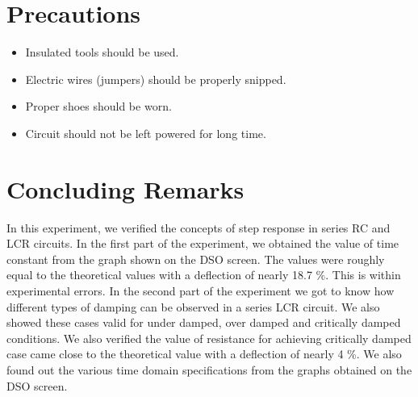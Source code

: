 \documentclass{article}
\begin{document}
\vspace{15px}

\section{Precautions}

\begin{itemize}
\item Insulated tools should be used.
\item Electric wires (jumpers) should be properly snipped.
\item Proper shoes should be worn.
\item Circuit should not be left powered for long time.

\end{itemize}

\vspace{15px}

\section{Concluding Remarks}
In this experiment, we verified the concepts of step response in series RC and LCR circuits. In the first part of the experiment, we obtained the value of time constant from the graph shown on the DSO screen. The values were roughly equal to the theoretical values with a deflection of nearly 18.7 \%. This is within experimental errors. In the second part of the experiment we got to know how different types of damping can be observed in a series LCR circuit. We also showed these cases valid for under damped, over damped and critically damped conditions. We also verified the value of resistance for achieving critically damped case came close to the theoretical value with a deflection of nearly 4 \%. We also found out the various time domain specifications from the graphs obtained on the DSO screen.
\end{document}
